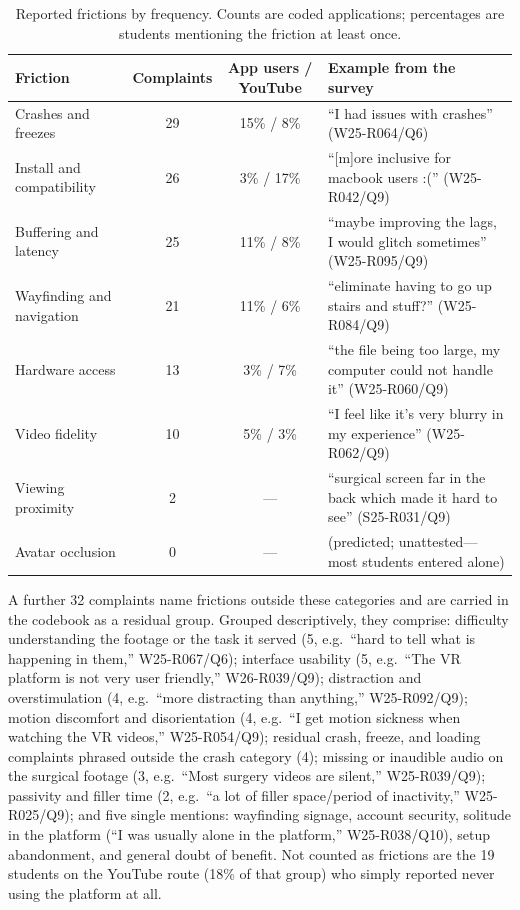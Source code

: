 \begin{table}[h]
\centering
\small
\begin{tabular}{lccl}
\hline
Friction & Complaints & App users / YouTube & Example from the survey \\
\hline
Crashes and freezes & 29 & 15\% / 8\% &
  ``I had issues with crashes'' (W25-R064/Q6) \\
Install and compatibility & 26 & 3\% / 17\% &
  ``[m]ore inclusive for macbook users :('' (W25-R042/Q9) \\
Buffering and latency & 25 & 11\% / 8\% &
  ``maybe improving the lags, I would glitch sometimes'' (W25-R095/Q9) \\
Wayfinding and navigation & 21 & 11\% / 6\% &
  ``eliminate having to go up stairs and stuff?'' (W25-R084/Q9) \\
Hardware access & 13 & 3\% / 7\% &
  ``the file being too large, my computer could not handle it'' (W25-R060/Q9) \\
Video fidelity & 10 & 5\% / 3\% &
  ``I feel like it's very blurry in my experience'' (W25-R062/Q9) \\
Viewing proximity & 2 & --- &
  ``surgical screen far in the back which made it hard to see'' (S25-R031/Q9) \\
Avatar occlusion & 0 & --- &
  (predicted; unattested---most students entered alone) \\
\hline
\end{tabular}
\caption{Reported frictions by frequency. Counts are coded applications;
percentages are students mentioning the friction at least once.}
\end{table}

A further 32 complaints name frictions outside these categories and are
carried in the codebook as a residual group. Grouped descriptively, they
comprise: difficulty understanding the footage or the task it served (5,
e.g.\ ``hard to tell what is happening in them,'' W25-R067/Q6); interface
usability (5, e.g.\ ``The VR platform is not very user friendly,''
W26-R039/Q9); distraction and overstimulation (4, e.g.\ ``more distracting
than anything,'' W25-R092/Q9); motion discomfort and disorientation (4,
e.g.\ ``I get motion sickness when watching the VR videos,'' W25-R054/Q9);
residual crash, freeze, and loading complaints phrased outside the crash
category (4); missing or inaudible audio on the surgical footage (3, e.g.\
``Most surgery videos are silent,'' W25-R039/Q9); passivity and filler time
(2, e.g.\ ``a lot of filler space/period of inactivity,'' W25-R025/Q9); and
five single mentions: wayfinding signage, account security, solitude in the
platform (``I was usually alone in the platform,'' W25-R038/Q10), setup
abandonment, and general doubt of benefit. Not counted as frictions are the
19 students on the YouTube route (18\% of that group) who simply reported
never using the platform at all.
